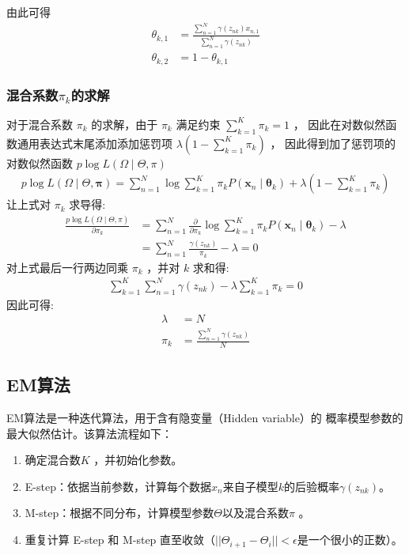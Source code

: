 \documentclass[UTF8]{ctexart}
\numberwithin{equation}{section}
\begin{document}
由此可得
$$
\begin{aligned}
\theta_{k, 1} &=\frac{\sum_{n=1}^{N} \gamma\left(z_{n k}\right) x_{n, 1}}{\sum_{n=1}^{N} \gamma\left(z_{n k}\right)} \\
\theta_{k, 2} &=1-\theta_{k, 1}
\end{aligned}
$$

\subsubsection{混合系数$\pi_k$的求解}

对于混合系数 $\pi_{k}$ 的求解，由于 $\pi_{k}$ 满足约束 $\sum_{k=1}^{K} \pi_{k}=1$ ， 
因此在对数似然函数通用表达式末尾添加添加惩罚项 $\lambda\left(1-\sum_{k=1}^{K} \pi_{k}\right)$ ，
因此得到加了惩罚项的对数似然函数 $p \log L(\Omega \mid \Theta, \pi)$
$$
\begin{aligned}
p \log L(\Omega \mid \Theta, \boldsymbol{\pi})=\sum_{n=1}^{N} \log \sum_{k=1}^{K} \pi_{k} P\left(\boldsymbol{x}_{n} \mid \boldsymbol{\theta}_{k}\right)+\lambda\left(1-\sum_{k=1}^{K} \pi_{k}\right)
\end{aligned}
$$
让上式对 $\pi_{k}$ 求导得:
$$
\begin{aligned}
\frac{p \log L(\Omega \mid \Theta, \pi)}{\partial \pi_{k}} 
&=\sum_{n=1}^{N} \frac{\partial}{\partial \pi_{k}} \log \sum_{k=1}^{K} \pi_{k} P\left(\boldsymbol{x}_{n} \mid \boldsymbol{\theta}_{k}\right)-\lambda \\
&=\sum_{n=1}^{N} \frac{\gamma\left(z_{n k}\right)}{\pi_{k}}-\lambda=0
\end{aligned}
$$
对上式最后一行两边同乘 $\pi_{k}$ ，并对 $k$ 求和得:
$$
\begin{aligned}
\sum_{k=1}^{K} \sum_{n=1}^{N} \gamma\left(z_{n k}\right)-\lambda \sum_{k=1}^{K} \pi_{k}=0
\end{aligned}
$$
因此可得:
$$
\begin{aligned}
\lambda&=N\\
\pi_{k}&=\frac{\sum_{n=1}^{N} \gamma\left(z_{n k}\right)}{N}
\end{aligned}
$$

\subsection{EM算法}
EM算法是一种迭代算法，用于含有隐变量（Hidden variable）的
概率模型参数的最大似然估计。该算法流程如下：
\begin{enumerate}
    \item 确定混合数$K$ ，并初始化参数。
    \item E-step：依据当前参数，计算每个数据$x_n$来自子模型$k$的后验概率$\gamma(z_{n k})$。
    \item M-step：根据不同分布，计算模型参数$\Theta$以及混合系数$\pi$ 。
    \item 重复计算 E-step 和 M-step 直至收敛（$||\Theta_{i+1}-\Theta_{i}|| < \epsilon$是一个很小的正数）。
\end{enumerate}
\end{document}
